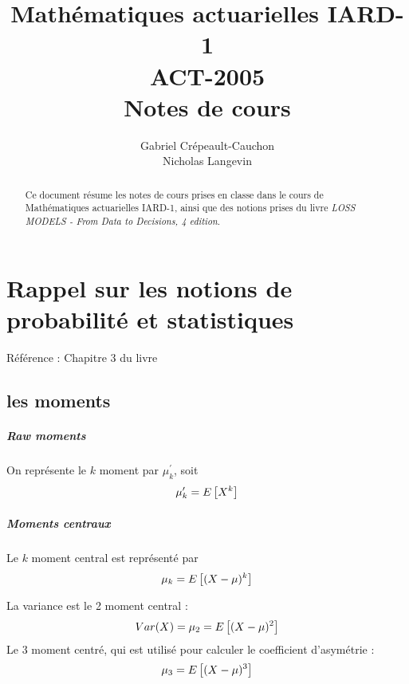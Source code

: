 \documentclass[12pt, french]{report}
\title{Mathématiques actuarielles IARD-1 \\
ACT-2005 \\
Notes de cours}
\author{Gabriel Crépeault-Cauchon \\
Nicholas Langevin}
\begin{document}
\maketitle

\tableofcontents


\begin{abstract}
Ce document résume les notes de cours prises en classe dans le cours de Mathématiques actuarielles IARD-1, ainsi que des notions prises du livre \textit{LOSS MODELS - From Data to Decisions, 4 edition}.
\end{abstract}

\chapter{Rappel sur les notions de probabilité et statistiques}
Référence : Chapitre 3 du livre
\section{les moments}

\paragraph{\textit{Raw moments}}
On représente le $k$ moment par $\mu_k^\prime$, soit
\begin{equation}
\mu_k^\prime = E \left[ X^k \right] 
\end{equation}

\paragraph{Moments centraux} Le $k$ moment central est représenté par
\begin{equation}
\mu_k = E \left[ (X - \mu)^k \right]
\end{equation}

\begin{exemple}
La variance est le 2 moment central : 
\begin{align*}
Var(X) = \mu_2 =  E \left[ (X - \mu)^2 \right] \\
\end{align*}
Le 3 moment centré, qui est utilisé pour calculer le coefficient d'asymétrie : 
\begin{align*}
\mu_3 = E \left[ (X-\mu)^3 \right]
\end{align*}
\end{exemple}
\end{document}
